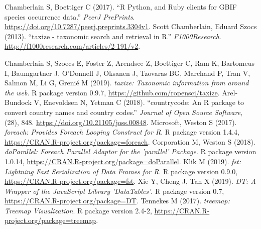 \documentclass[journal,datadescriptor,accept,moreauthors,pdftex]{Definitions/mdpi}
\begin{document}
Chamberlain S, Boettiger C (2017).
``R Python, and Ruby clients for GBIF species occurrence data.''
\emph{PeerJ PrePrints}.
\url{https://doi.org/10.7287/peerj.preprints.3304v1}.
\newline Scott Chamberlain, Eduard Szocs (2013).
``taxize - taxonomic search and retrieval in R.''
\emph{F1000Research}.
\url{http://f1000research.com/articles/2-191/v2}.

Chamberlain S, Szoecs E, Foster Z, Arendsee Z, Boettiger C, Ram K, Bartomeus I, Baumgartner J, O'Donnell J, Oksanen J, Tzovaras BG, Marchand P, Tran V, Salmon M, Li G, Grenié M (2019).
\emph{taxize: Taxonomic information from around the web}.
R package version 0.9.7, \url{https://github.com/ropensci/taxize}.
\newline Arel-Bundock V, Enevoldsen N, Yetman C (2018).
``countrycode: An R package to convert country names and country codes.''
\emph{Journal of Open Source Software}, (28), 848.
\url{https://doi.org/10.21105/joss.00848}.
\newline Microsoft, Weston S (2017).
\emph{foreach: Provides Foreach Looping Construct for R}.
R package version 1.4.4, \url{https://CRAN.R-project.org/package=foreach}.
\newline Corporation M, Weston S (2018).
\emph{doParallel: Foreach Parallel Adaptor for the 'parallel' Package}.
R package version 1.0.14, \url{https://CRAN.R-project.org/package=doParallel}.
\newline Klik M (2019).
\emph{fst: Lightning Fast Serialization of Data Frames for R}.
R package version 0.9.0, \url{https://CRAN.R-project.org/package=fst}.
\newline Xie Y, Cheng J, Tan X (2019).
\emph{DT: A Wrapper of the JavaScript Library 'DataTables'}.
R package version 0.7, \url{https://CRAN.R-project.org/package=DT}.
\newline Tennekes M (2017).
\emph{treemap: Treemap Visualization}.
R package version 2.4-2, \url{https://CRAN.R-project.org/package=treemap}.
\newline 



\end{document}
